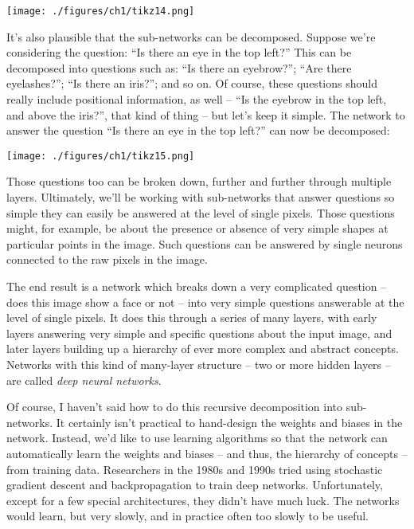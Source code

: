 \documentclass[a4paper,twoside,10pt]{book}
\begin{document}
\begin{center}
	\texttt{[image: ./figures/ch1/tikz14.png]}
\end{center}
It's also plausible that the sub-networks can be decomposed. Suppose we're considering the question: ``Is there an eye in the top left?'' This can be decomposed into questions such as: ``Is there an eyebrow?''; ``Are there eyelashes?''; ``Is there an iris?''; and so on. Of course, these questions should really include positional information, as well -- ``Is the eyebrow in the top left, and above the iris?'', that kind of thing -- but let's keep it simple. The network to answer the question ``Is there an eye in the top left?'' can now be decomposed:

\begin{center}
	\texttt{[image: ./figures/ch1/tikz15.png]}
\end{center}
Those questions too can be broken down, further and further through multiple layers. Ultimately, we'll be working with sub-networks that answer questions so simple they can easily be answered at the level of single pixels. Those questions might, for example, be about the presence or absence of very simple shapes at particular points in the image. Such questions can be answered by single neurons connected to the raw pixels in the image.

The end result is a network which breaks down a very complicated question -- does this image show a face or not -- into very simple questions answerable at the level of single pixels. It does this through a series of many layers, with early layers answering very simple and specific questions about the input image, and later layers building up a hierarchy of ever more complex and abstract concepts. Networks with this kind of many-layer structure -- two or more hidden layers -- are called \textit{deep neural networks}.

Of course, I haven't said how to do this recursive decomposition into sub-networks. It certainly isn't practical to hand-design the weights and biases in the network. Instead, we'd like to use learning algorithms so that the network can automatically learn the weights and biases -- and thus, the hierarchy of concepts -- from training data. Researchers in the 1980s and 1990s tried using stochastic gradient descent and backpropagation to train deep networks. Unfortunately, except for a few special architectures, they didn't have much luck. The networks would learn, but very slowly, and in practice often too slowly to be useful.
\end{document}
